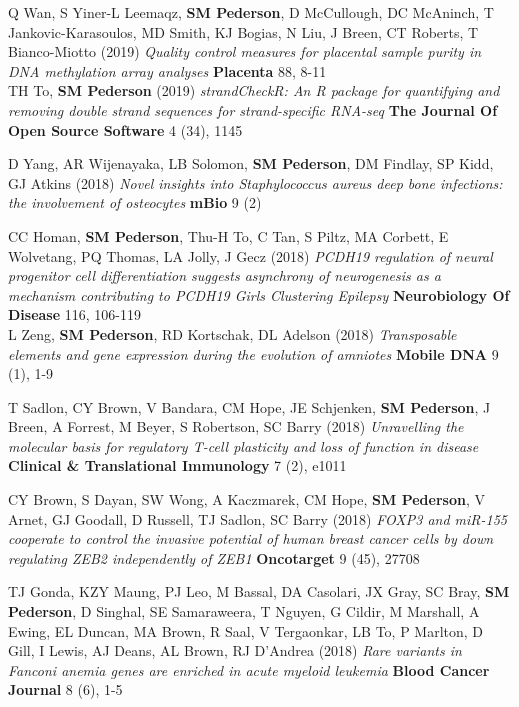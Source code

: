 \documentclass[11pt,a4paper,]{moderncv}
\begin{document}
\begin{modenumerate}
     \item Q Wan, S Yiner-L Leemaqz, \textbf{SM Pederson}, D McCullough, DC McAninch, T Jankovic-Karasoulos, MD Smith, KJ Bogias, N Liu, J Breen, CT Roberts, T Bianco-Miotto (2019) \emph{Quality control measures for placental sample purity in DNA methylation array analyses} \textbf{Placenta} 88, 8-11 \\[-4mm] 
     \moditem{*} TH To, \textbf{SM Pederson} (2019) \emph{strandCheckR: An R package for quantifying and removing double strand sequences for strand-specific RNA-seq} \textbf{The Journal Of Open Source Software} 4 (34), 1145 \\[-4mm] 
     \item D Yang, AR Wijenayaka, LB Solomon, \textbf{SM Pederson}, DM Findlay, SP Kidd, GJ Atkins (2018) \emph{Novel insights into Staphylococcus aureus deep bone infections: the involvement of osteocytes} \textbf{mBio} 9 (2) \\[-4mm] 
     \item CC Homan, \textbf{SM Pederson}, Thu-H To, C Tan, S Piltz, MA Corbett, E Wolvetang, PQ Thomas, LA Jolly, J Gecz (2018) \emph{PCDH19 regulation of neural progenitor cell differentiation suggests asynchrony of neurogenesis as a mechanism contributing to PCDH19 Girls Clustering Epilepsy} \textbf{Neurobiology Of Disease} 116, 106-119 \\[-4mm] 
     \moditem{*} L Zeng, \textbf{SM Pederson}, RD Kortschak, DL Adelson (2018) \emph{Transposable elements and gene expression during the evolution of amniotes} \textbf{Mobile DNA} 9 (1), 1-9 \\[-4mm] 
     \item T Sadlon, CY Brown, V Bandara, CM Hope, JE Schjenken, \textbf{SM Pederson}, J Breen, A Forrest, M Beyer, S Robertson, SC Barry (2018) \emph{Unravelling the molecular basis for regulatory T-cell plasticity and loss of function in disease} \textbf{Clinical \& Translational Immunology} 7 (2), e1011 \\[-4mm] 
     \item CY Brown, S Dayan, SW Wong, A Kaczmarek, CM Hope, \textbf{SM Pederson}, V Arnet, GJ Goodall, D Russell, TJ Sadlon, SC Barry (2018) \emph{FOXP3 and miR-155 cooperate to control the invasive potential of human breast cancer cells by down regulating ZEB2 independently of ZEB1} \textbf{Oncotarget} 9 (45), 27708 \\[-4mm] 
     \item TJ Gonda, KZY Maung, PJ Leo, M Bassal, DA Casolari, JX Gray, SC Bray, \textbf{SM Pederson}, D Singhal, SE Samaraweera, T Nguyen, G Cildir, M Marshall, A Ewing, EL Duncan, MA Brown, R Saal, V Tergaonkar, LB To, P Marlton, D Gill, I Lewis, AJ Deans, AL Brown, RJ D'Andrea (2018) \emph{Rare variants in Fanconi anemia genes are enriched in acute myeloid leukemia} \textbf{Blood Cancer Journal} 8 (6), 1-5 \\[-4mm] 

\end{modenumerate}
\end{document}
